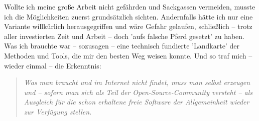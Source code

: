 Wollte ich meine große Arbeit nicht gefährden und Sackgassen vermeiden, musste
ich die Möglichkeiten zuerst grundsätzlich sichten. Andernfalls hätte ich nur
eine Variante willkürlich herausgegriffen und wäre Gefahr gelaufen, schließlich
-- trotz aller investierten Zeit und Arbeit -- doch 'aufs falsche Pferd gesetzt'
zu haben. Was ich brauchte war -- sozusagen -- eine technisch fundierte
'Landkarte' der Methoden und Tools, die mir den besten Weg weisen konnte. Und so
traf mich -- wieder einmal -- die Erkenntnis:

\begin{quote}\textit{Was man braucht und im Internet nicht findet, muss man
selbst erzeugen und -- sofern man sich als Teil der Open-Source-Community
versteht -- als Ausgleich für die schon erhaltene freie Software der
Allgemeinheit wieder zur Verfügung stellen.}
\end{quote}


%
